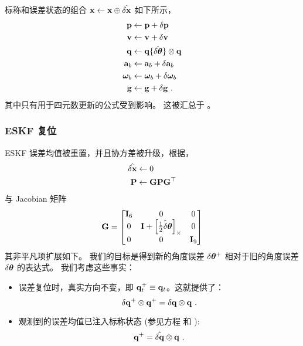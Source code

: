 标称和误差状态的组合 ${\bf x} \gets {\bf x}\oplus\hat{\delta{\bf x}}$ 如下所示，
%
\begin{subequations}
%
\begin{align}
{\bf p} &\gets {\bf p} + \delta{\bf p} \\
{\bf v} &\gets {\bf v} + \delta{\bf v} \\
{\bf q} &\gets {\bf q}\{\hat{\delta{\bm \theta}}\} \otimes {\bf q} \\ 
{\bf a}_b &\gets {\bf a}_b + \delta{\bf a}_b \\
{\bm \omega}_b &\gets {\bm \omega}_b + \delta{\bm \omega}_b \\
{\bf g} &\gets {\bf g} + \delta{\bf g} ~.
\end{align}%
\end{subequations}
%
其中只有用于四元数更新的公式受到影响。 
这被汇总于 。

\subsubsection{ESKF 复位}

ESKF 误差均值被重置，并且协方差被升级，根据，
%
%
\begin{align}
\hat{\delta{\bf x}} &\gets 0 \\
{\bf P} &\gets {\bf G}{\bf P}{\bf G}^{\top}
\end{align}%
%
与 Jacobian 矩阵
%
\begin{equation}
{\bf G} = \begin{bmatrix}
{\bf I}_6 & 0 & 0 \\
0 & {\bf I}+\left[\hat{\frac12\delta{\bm \theta}}\right]_\times & 0 \\
0 & 0 & {\bf I}_9
\end{bmatrix}
\end{equation}
%
其非平凡项扩展如下。 
我们的目标是得到新的角度误差 $\delta{\bm \theta}^+$ 相对于旧的角度误差 $\delta{\bm \theta}$ 的表达式。 
我们考虑这些事实：
\begin{itemize}
\item
误差复位时，真实方向不变，即 ${\bf q}_t^+ \equiv {\bf q}_t$。这就提供了：
%
\begin{equation}
\delta{\bf q}^+\otimes{\bf q}^+ = \delta{\bf q}\otimes {\bf q}~.
\end{equation}
%
\item
观测到的误差均值已注入标称状态 (参见方程  和 ):
%
\begin{equation}
{\bf q}^+ = \hat{\delta{\bf q}} \otimes {\bf q} ~.
\end{equation}
\end{itemize}

